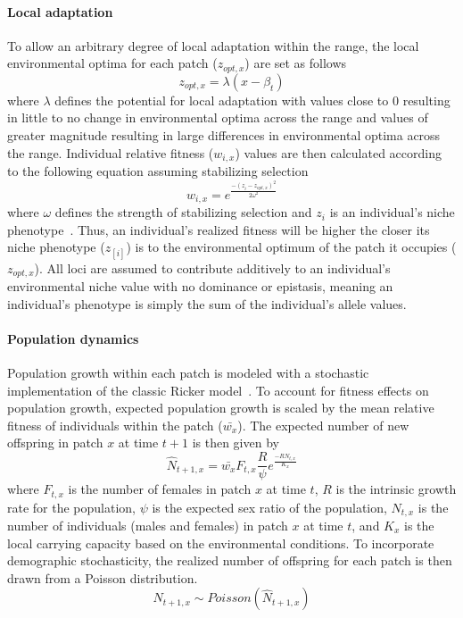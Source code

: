 \documentclass[12pt, oneside]{article}
\begin{document}
\paragraph{Local adaptation}
To allow an arbitrary degree of local adaptation within the range, the local environmental optima for each patch ($z_{opt,x}$) are set as follows
\begin{equation}
z_{opt,x}=\lambda(x-\beta_{t})
\end{equation}
where $\lambda$ defines the potential for local adaptation with values close to $0$ resulting in little to no change in environmental optima across the range and values of greater magnitude resulting in large differences in environmental optima across the range. Individual relative fitness ($w_{i,x}$) values are then calculated according to the following equation assuming stabilizing selection
\begin{equation}
w_{i,x}=e^{\frac{-(z_{i}-z_{opt,x})^{2}}{2\omega^{2}}}
\end{equation}
where $\omega$ defines the strength of stabilizing selection and $z_{i}$ is an individual's niche phenotype~\citep{lande1976natural}. Thus, an individual's realized fitness will be higher the closer its niche phenotype ($z_[i]$) is to the environmental optimum of the patch it occupies ($z_{opt,x}$). All loci are assumed to contribute additively to an individual's environmental niche value with no dominance or epistasis, meaning an individual's phenotype is simply the sum of the individual's allele values.

\paragraph{Population dynamics}
Population growth within each patch is modeled with a stochastic implementation of the classic Ricker model~\citep{ricker1954stock, melbourne2008extinction}. To account for fitness effects on population growth, expected population growth is scaled by the mean relative fitness of individuals within the patch ($\bar{w_{x}}$). The expected number of new offspring in patch $x$ at time $t+1$ is then given by
\begin{equation}
\hat{N}_{t+1,x}=\bar{w_{x}}F_{t,x}\frac{R}{\psi}e^{\frac{-RN_{t,x}}{K_{x}}}
\end{equation}
where $F_{t,x}$ is the number of females in patch $x$ at time $t$, $R$ is the intrinsic growth rate for the population, $\psi$ is the expected sex ratio of the population, $N_{t,x}$ is the number of individuals (males and females) in patch $x$ at time $t$, and $K_{x}$ is the local carrying capacity based on the environmental conditions. To incorporate demographic stochasticity, the realized number of offspring for each patch is then drawn from a Poisson distribution.
\begin{equation}
N_{t+1,x}\sim Poisson(\hat{N}_{t+1,x})
\end{equation}
\end{document}
